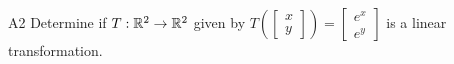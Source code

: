 \documentclass{sbgLAquiz}
\begin{document}
\begin{problem}{A2}
 Determine if $T: \mathbb{R}^2 \rightarrow \mathbb{R}^2$ given by $T\left(\begin{bmatrix} x \\ y \end{bmatrix}\right) = \begin{bmatrix} e^{x} \\ e^y \end{bmatrix}$ is a linear transformation.
\end{problem}
\end{document}
